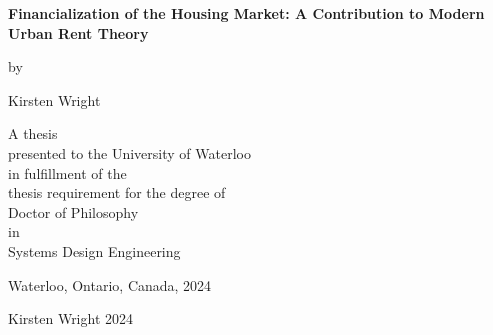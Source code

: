 \pagestyle{empty}

\begin{titlepage}
        \begin{center}
        \vspace*{1.0cm}

        \Huge
        {\bf Financialization of the Housing Market: A Contribution to Modern Urban Rent Theory}

        \vspace*{1.0cm}

        \normalsize
        by \\

        \vspace*{1.0cm}

        \Large
        Kirsten Wright \\

        \vspace*{3.0cm}

        \normalsize
        A thesis \\
        presented to the University of Waterloo \\ 
        in fulfillment of the \\
        thesis requirement for the degree of \\
        Doctor of Philosophy \\
        in \\
        Systems Design Engineering \\

        \vspace*{2.0cm}

        Waterloo, Ontario, Canada, 2024 \\

        \vspace*{1.0cm}

        \textcopyright{} Kirsten Wright 2024 \\ %

        \end{center}
\end{titlepage}

\pagestyle{plain}
\setcounter{page}{2}

\renewcommand\contentsname{Table of Contents}
\tableofcontents
\cleardoublepage
{}    %

